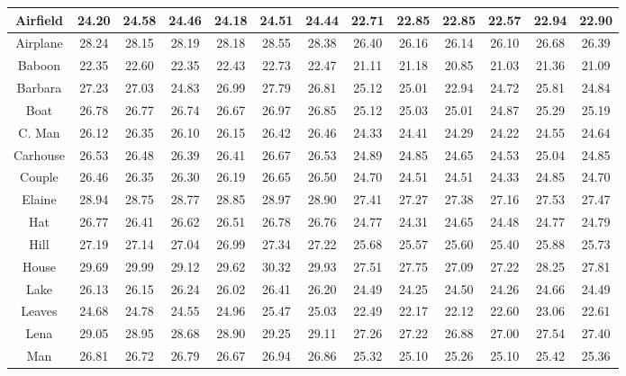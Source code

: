\begin{table}[t]
\begin{adjustwidth}{-0.5cm}{}
\begin{center}
\begin{tabular}{|c||c|c|c|c|c|c||c|c|c|c|c|c|}
\\
\hline
 Airfield & 24.20 & 24.58 & 24.46  &24.18 & 24.51 & 24.44    & 22.71 & 22.85 & 22.85 & 22.57 &22.94 &22.90 
\\
\hline
 Airplane & 28.24 & 28.15 & 28.19 & 28.18 &  28.55 & 28.38     & 26.40 & 26.16 & 26.14  & 26.10 &  26.68 & 26.39
\\
\hline
 Baboon & 22.35  & 22.60 & 22.35 & 22.43  & 22.73 &22.47     &  21.11&  21.18  & 20.85  & 21.03  & 21.36 & 21.09
\\
\hline
 Barbara & 27.23  & 27.03  & 24.83  & 26.99 &  27.79 & 26.81    & 25.12  & 25.01  & 22.94   &  24.72& 25.81 &24.84
\\
\hline
  Boat& 26.78 & 26.77  & 26.74  & 26.67 & 26.97 &  26.85   & 25.12 & 25.03 & 25.01 &  24.87&  25.29 &25.19         
\\
\hline
 C. Man   & 26.12 & 26.35   & 26.10 & 26.15 & 26.42 & 26.46   & 24.33 & 24.41 &  24.29  & 24.22 &  24.55 &24.64     
\\
\hline
 Carhouse  & 26.53 & 26.48  &  26.39   & 26.41 & 26.67 &26.53   &  24.89 & 24.85  &  24.65  & 24.53  &25.04 &24.85
\\
\hline
 Couple & 26.46 & 26.35  & 26.30 & 26.19 &  26.65 & 26.50   & 24.70 & 24.51 & 24.51 & 24.33 & 24.85 &24.70   
\\
\hline
 Elaine &  28.94 & 28.75 & 28.77   & 28.85 & 28.97 &28.90    &   27.41  & 27.27 & 27.38  &  27.16 &27.53 &27.47   
\\
\hline
 Hat  &  26.77 & 26.41 & 26.62  & 26.51 & 26.78 &26.76      &   24.77  & 24.31  & 24.65   &  24.48 &24.77 & 24.79
\\
\hline
 Hill  & 27.19 & 27.14  & 27.04 & 26.99   &27.34 &27.22     & 25.68 & 25.57 & 25.60 &  25.40 & 25.88  & 25.73
\\
\hline
 House  & 29.69 & 29.99  & 29.12  & 29.62  & 30.32 &29.93     & 27.51 & 27.75  &  27.09 &  27.22 & 28.25 & 27.81    
\\
\hline
 Lake   &  26.13  & 26.15  & 26.24  &  26.02  & 26.41 &26.20    & 24.49 & 24.25 & 24.50 & 24.26 &24.66 &24.49   
\\
\hline
 Leaves   & 24.68 & 24.78   & 24.55  & 24.96 & 25.47 &25.03     & 22.49  & 22.17 & 22.12 &  22.60 & 23.06 & 22.61
\\
\hline
 Lena  & 29.05 & 28.95 & 28.68 & 28.90 &  29.25 & 29.11      & 27.26 & 27.22 &  26.88 & 27.00 & 27.54 &  27.40   
\\
\hline
 Man   & 26.81 & 26.72    & 26.79 & 26.67 &  26.94 & 26.86   & 25.32 & 25.10  & 25.26  & 25.10 &  25.42 & 25.36      

\end{tabular}
\end{center}
\end{adjustwidth}
\end{table}
